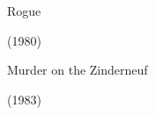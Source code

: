 \documentclass{beamer}
\begin{document}
\begin{frame}[c]
	\centering
	\Huge
	Rogue
	
	(1980)
\end{frame}


\begin{frame}[plain]
\end{frame}

\begin{frame}[c]
	\centering
	\Huge
	Murder on the Zinderneuf
	
	(1983)
\end{frame}

\begin{frame}[plain]
\end{frame}
\end{document}
